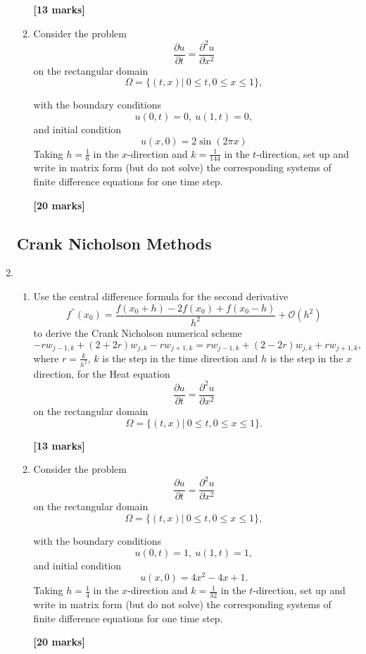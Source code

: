 \begin{enumerate}
\begin{enumerate}
\begin{flushright}
\textbf{[13 marks]}
\end{flushright}
	\item Consider the problem
	\[\frac{\partial u}{\partial t}=\frac{\partial^2 u}{\partial x^2} \]
	on the rectangular domain
		\[\Omega=\{(t,x)| \ 0\leq t, 0 \leq x \leq 1\}, \]

	with the boundary conditions
	\[ u(0,t)=0, \ u(1,t)=0,   \]
	and initial condition
	\[	u(x,0)=2\sin(2\pi x) \]
		Taking $h=\frac{1}{6}$ in the $x$-direction and $k=\frac{1}{144}$ in the $t$-direction, set up and write in matrix form (but do not solve) the corresponding systems of finite difference equations for one time step.\\
\begin{flushright}
\textbf{[20 marks]}
\end{flushright}
	
	
\end{enumerate}


\subsection{Crank Nicholson Methods}

	\item 
\begin{enumerate}
	
	\item 
	Use the central difference formula for the second derivative 
	\[ f^{''}(x_0)=\frac{f(x_0+h)-2f(x_0)+f(x_0-h)}{h^2}+\mathcal{O}(h^2)\]
	to derive the Crank Nicholson numerical scheme
	\[-rw_{j-1,k}+(2+2r)w_{j,k}-rw_{j+1,k}=rw_{j-1,k}+(2-2r)w_{j,k}+rw_{j+1,k},\]
	where $r=\frac{k}{h^2}$, $k$ is the step in the time direction and $h$ is the step in the $x$ direction, 
	for the Heat equation 
	\[\frac{\partial u}{\partial t}=\frac{\partial^2 u}{\partial x^2} \]
	on the rectangular domain
		\[\Omega=\{(t,x)| \ 0\leq t, 0 \leq x \leq 1\}. \]

\begin{flushright}
\textbf{[13 marks]}
\end{flushright}
	
	\item Consider the problem
	\[\frac{\partial u}{\partial t}=\frac{\partial^2 u}{\partial x^2} \]
	on the rectangular domain
		\[\Omega=\{(t,x)| \ 0\leq t, 0 \leq x \leq 1\}, \]

	with the boundary conditions
	\[ u(0,t)=1, \ u(1,t)=1,   \]
	and initial condition
	\[	u(x,0)=4x^2-4x+1.\]
		Taking $h=\frac{1}{4}$ in the $x$-direction and $k=\frac{1}{32}$ in the $t$-direction, set up and write in matrix form (but do not solve) the corresponding systems of finite difference equations for one time step.\\
\begin{flushright}
\textbf{[20 marks]}
\end{flushright}
\end{enumerate}


\end{enumerate}
